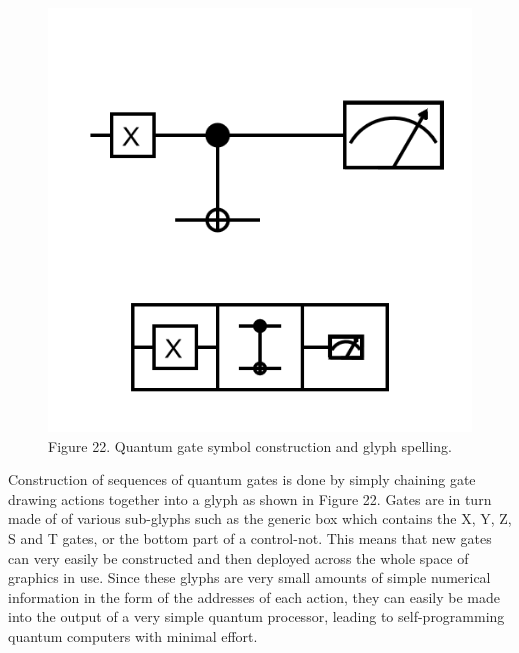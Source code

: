 \documentclass[11pt]{article}
\begin{document}
\begin{figure}

\includegraphics[width=\linewidth]{figures/figure22_gates.png}

\caption{Figure 22. Quantum gate symbol construction and glyph spelling.}
\end{figure}




    Construction of sequences of quantum gates is done by simply chaining gate drawing actions together into a glyph as shown in Figure 22. Gates are in turn made of of various sub-glyphs such as the generic box which contains the X, Y, Z, S and T gates, or the bottom part of a control-not.  This means that new gates can very easily be constructed and then deployed across the whole space of graphics in use.  Since these glyphs are very small amounts of simple numerical information in the form of the addresses of each action, they can easily be made into the output of a very simple quantum processor, leading to self-programming quantum computers with minimal effort.
\end{document}
